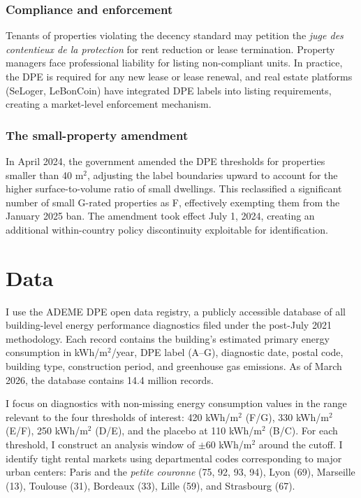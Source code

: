 \documentclass[12pt]{article}
\begin{document}
\subsubsection*{Compliance and enforcement} Tenants of properties violating the decency standard may petition the \textit{juge des contentieux de la protection} for rent reduction or lease termination. Property managers face professional liability for listing non-compliant units. In practice, the DPE is required for any new lease or lease renewal, and real estate platforms (SeLoger, LeBonCoin) have integrated DPE labels into listing requirements, creating a market-level enforcement mechanism.

\subsubsection*{The small-property amendment} In April 2024, the government amended the DPE thresholds for properties smaller than 40 m$^2$, adjusting the label boundaries upward to account for the higher surface-to-volume ratio of small dwellings. This reclassified a significant number of small G-rated properties as F, effectively exempting them from the January 2025 ban. The amendment took effect July 1, 2024, creating an additional within-country policy discontinuity exploitable for identification.


\section{Data}

I use the ADEME DPE open data registry, a publicly accessible database of all building-level energy performance diagnostics filed under the post-July 2021 methodology. Each record contains the building's estimated primary energy consumption in kWh/m$^2$/year, DPE label (A--G), diagnostic date, postal code, building type, construction period, and greenhouse gas emissions. As of March 2026, the database contains 14.4 million records.

I focus on diagnostics with non-missing energy consumption values in the range relevant to the four thresholds of interest: 420 kWh/m$^2$ (F/G), 330 kWh/m$^2$ (E/F), 250 kWh/m$^2$ (D/E), and the placebo at 110 kWh/m$^2$ (B/C). For each threshold, I construct an analysis window of $\pm$60 kWh/m$^2$ around the cutoff. I identify tight rental markets using departmental codes corresponding to major urban centers: Paris and the \textit{petite couronne} (75, 92, 93, 94), Lyon (69), Marseille (13), Toulouse (31), Bordeaux (33), Lille (59), and Strasbourg (67).
\end{document}
